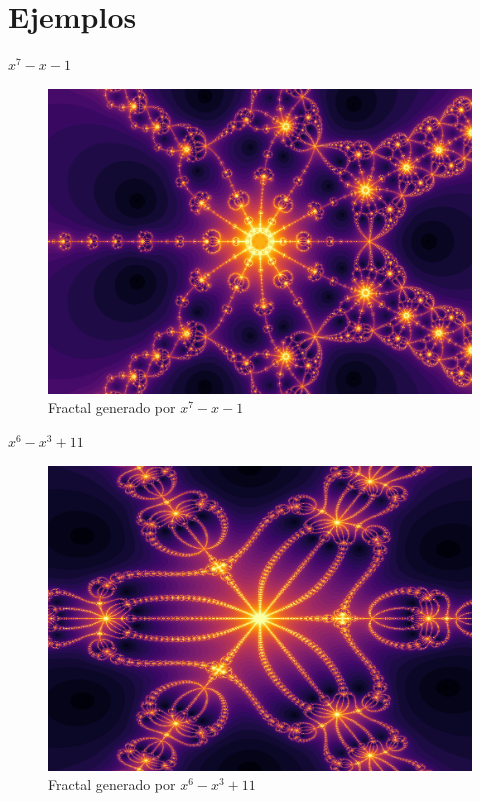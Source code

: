 \section{Ejemplos} 
$x^7-x-1$
\begin{figure}[H]
    \centering
    \includegraphics[scale=0.26]{images/ej1.png}
    \caption{Fractal generado por $x^7-x-1$}
    \label{fig:ej_1}
\end{figure}

$x^6-x^3+11$
\begin{figure}[H]
    \centering
    \includegraphics[scale=0.26]{images/ej2.png}
    \caption{Fractal generado por $x^6-x^3+11$}
    \label{fig:ej_2}
\end{figure}


